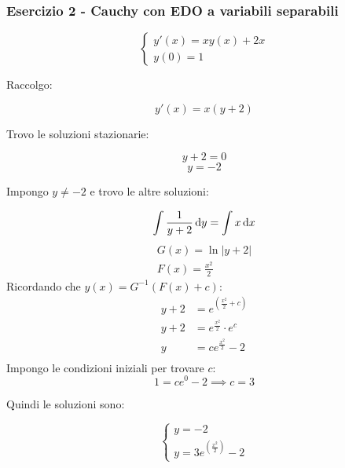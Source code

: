 \pagebreak
\subsubsection*{Esercizio 2 {-} Cauchy con EDO a variabili separabili}

\begin{equation*}
    \begin{cases}
        y'(x) = xy(x)+2x \\
        y(0) = 1
    \end{cases}
\end{equation*}

Raccolgo:

\[
    y'(x)=x(y+2)
\]

Trovo le soluzioni stazionarie:

\[
    y+2=0
\]
\[
    y=-2
\]

Impongo \(y \ne -2\) e trovo le altre soluzioni:

\[
    \int \frac{1}{y+2} \mathop{}\!\mathrm{d} y = \int x \mathop{}\!\mathrm{d} x
\]
\begin{align*}
    G(x) = \ln |y+2| \\
    F(x) = \frac{x^2}{2}
\end{align*}
Ricordando che \(y(x) = G^{-1}(F(x) + c)\):
\begin{align*}
    y + 2 & = e^{\left( \frac{x^2}{2} + c \right)} \\
    y + 2 & = e^{\frac{x^{2}}{2}} \cdot e^c        \\
    y     & = ce^{\frac{x^{2}}{2}} - 2             \\
\end{align*}
Impongo le condizioni iniziali per trovare \(c\):
\[
    1 = c e^0 - 2 \implies c = 3
\]

Quindi le soluzioni sono:

\begin{equation*}
    \begin{cases}
        y = -2 \\
        y = 3e^{\left( \frac{x^{2}}{2} \right)} - 2
    \end{cases}
\end{equation*}
